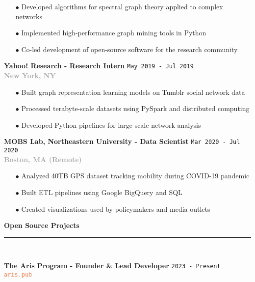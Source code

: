 \documentclass[11pt,a4paper]{article}
\newcommand{\sectiondivider}{%
    \vspace{2pt}\\%
    {\color{coral}\rule{30pt}{2pt}}\\%
    \vspace{8pt}%
}
\newcommand{\coralbullet}{{\color{coral}$\bullet$}\space}
\newcommand{\jobduration}[1]{%
    \textcolor{mediumgray}{\texttt{\small #1}}%
}
\newcommand{\companyname}[1]{%
    \textcolor{darkgray}{\textbf{#1}}%
}
\newcommand{\cvsectioncustom}[1]{%
    \vspace{12pt}%
    {\Large\color{navy}\textbf{#1}}%
    \sectiondivider%
}
\begin{document}
\begin{itemize}[leftmargin=15pt,itemsep=3pt]
    \item[\coralbullet] Developed algorithms for spectral graph theory applied to complex networks
    \item[\coralbullet] Implemented high-performance graph mining tools in Python
    \item[\coralbullet] Co-led development of open-source software for the research community
\end{itemize}

\vspace{8pt}

\textbf{\large\color{navy}Yahoo! Research - Research Intern} \hfill \jobduration{May 2019 - Jul 2019}\\
\companyname{New York, NY}

\begin{itemize}[leftmargin=15pt,itemsep=3pt]
    \item[\coralbullet] Built graph representation learning models on Tumblr social network data
    \item[\coralbullet] Processed terabyte-scale datasets using PySpark and distributed computing
    \item[\coralbullet] Developed Python pipelines for large-scale network analysis
\end{itemize}

\vspace{8pt}

\textbf{\large\color{navy}MOBS Lab, Northeastern University - Data Scientist} \hfill \jobduration{Mar 2020 - Jul 2020}\\
\companyname{Boston, MA (Remote)}

\begin{itemize}[leftmargin=15pt,itemsep=3pt]
    \item[\coralbullet] Analyzed 40TB GPS dataset tracking mobility during COVID-19 pandemic
    \item[\coralbullet] Built ETL pipelines using Google BigQuery and SQL
    \item[\coralbullet] Created visualizations used by policymakers and media outlets
\end{itemize}

\cvsectioncustom{Open Source Projects}

\textbf{\large\color{navy}The Aris Program - Founder \& Lead Developer} \hfill \jobduration{2023 - Present}\\
{\textcolor{coral}{\texttt{aris.pub}}}
\end{document}
